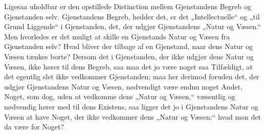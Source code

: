 \documentclass[12pt]{book}
\newcommand{\opage}[1]{\marginnote{\footnotesize\textit{[#1]}}}
\begin{document}
\opage{97}Ligesaa uholdbar er den opstillede Distinction mellem
Gjenstandens Begreb og Gjenstanden selv. Gjenstandens Begreb,
hedder det, er det „Intellectuelle“ og „til Grund Liggende“
i Gjenstanden, det, der udgjør Gjenstandens „Natur og
Væsen.“ Men hvorledes er det muligt at skille en Gjenstands
Natur og Væsen fra Gjenstanden selv? Hvad bliver der tilbage
af en Gjenstand, naar dens Natur og Væsen tænkes
borte? Dersom det i Gjenstanden, der ikke udgjør dens Natur
og Væsen, ikke hører til dens Begreb, saa maa det jo være
noget saa Tilfældigt, at det egentlig slet ikke vedkommer Gjenstanden;
maa her derimod foruden det, der udgjør Gjenstandens
Natur og Væsen, nødvendigt være endnu noget Andet, Noget,
som dog, uden at vedkomme dens „Natur og Væsen,“ væsentlig
og nødvendig hører med til dens Existens, saa ligger det
jo i Gjenstandens Natur og Væsen at have Noget, der ikke
vedkommer dens „Natur og Væsen:“ hvad mon det da være
for Noget?
\end{document}
